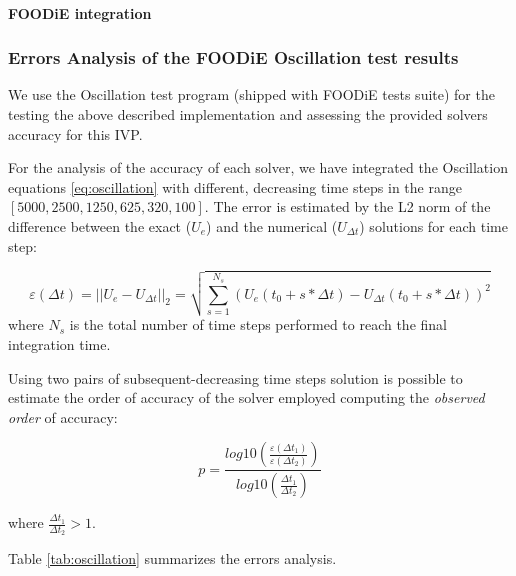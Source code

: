 \documentclass[pdftex,preprint,3p,times,numbers]{elsarticle}
\begin{document}
\paragraph{FOODiE integration}
\subsubsection{Errors Analysis of the FOODiE Oscillation test results}

We use the Oscillation test program (shipped with FOODiE tests suite) for the testing the above described implementation and assessing the provided solvers accuracy for this IVP.

For the analysis of the accuracy of each solver, we have integrated the Oscillation equations \ref{eq:oscillation} with different, decreasing time steps in the range $[5000, 2500, 1250, 625, 320, 100]$. The error is estimated by the L2 norm of the difference between the exact ($U_e$) and the numerical ($U_{\Delta t}$) solutions for each time step:

\begin{equation}
  \varepsilon (\Delta t) = || U_e - U_{\Delta t} ||_2 = \sqrt{ \sum_{s=1}^{N_s} { \left(U_e(t_0 + s * \Delta t) - U_{\Delta t}(t_0 + s * \Delta t) \right)^2 }}
\label{eq:oscillation-error}
\end{equation}
where $N_s$ is the total number of time steps performed to reach the final integration time.

Using two pairs of subsequent-decreasing time steps solution is possible to estimate the order of accuracy of the solver employed computing the \emph{observed order} of accuracy:

\begin{equation}
  p = \frac{log10 \left( \frac{\varepsilon (\Delta t_1)}{\varepsilon (\Delta t_2)} \right)}{log10 \left( \frac{\Delta t_1}{\Delta t_2} \right)}
\label{eq:oscillation-observed-order}
\end{equation}

where $\frac{\Delta t_1}{\Delta t_2}>1$.

Table \ref{tab:oscillation} summarizes the errors analysis.
\end{document}
